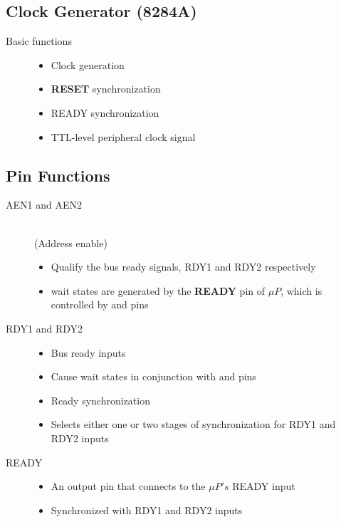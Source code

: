 \documentclass{article}
\begin{document}
\subsection{Clock Generator (8284A)}
\begin{description}
  \item[Basic functions]
  \begin{itemize}
    \item Clock generation
    \item \textbf{RESET} synchronization
    \item READY synchronization
    \item TTL-level peripheral clock signal
  \end{itemize}
\end{description}

\subsection{Pin Functions}
\begin{description}

  \item[AEN1 and AEN2]
  \\(Address enable)
  \begin{itemize}
    \item Qualify the bus ready signals, RDY1 and RDY2 respectively
    \item wait states are generated by the \textbf{READY} pin of $\mu P$, which is controlled
    by  and  pins
  \end{itemize}

  \item[RDY1 and RDY2]
  \begin{itemize}
    \item Bus ready inputs
    \item Cause wait states in conjunction with  and  pins
  \end{itemize}

  \item[]
  \begin{itemize}
    \item Ready synchronization
    \item Selects either one or two stages of synchronization for RDY1 and RDY2 inputs

  \end{itemize}

  \item[READY]
  \begin{itemize}
    \item An output pin that connects to the $\mu P's$ READY input
    \item Synchronized with RDY1 and RDY2 inputs

  \end{itemize}


\end{description}
\end{document}

